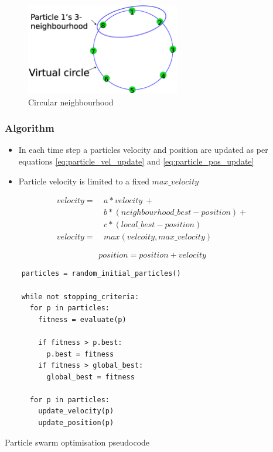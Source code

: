 \documentclass[a4paper]{article}
\begin{document}
\begin{figure}[h!]
  \centering
  \includegraphics[width=0.6\textwidth]{graphics/pso_neighbourhoods_3.eps}
  \caption{Circular neighbourhood}
  \label{fig:pso_neighbourhoods_3}
\end{figure}
\FloatBarrier

\subsubsection{Algorithm}

\begin{itemize}
  \item In each time step a particles velocity and position are updated as per
        equations \ref{eq:particle_vel_update} and \ref{eq:particle_pos_update}
  \item Particle velocity is limited to a fixed $max\_velocity$
\end{itemize}

\begin{equation}
  \label{eq:particle_vel_update}
  \begin{split}
    velocity = \: &a * velocity \: + \\
                  &b * (neighbourhood\_best - position) + \\
                  &c * (local\_best - position) \\
    velocity = \: &max(velcoity, max\_velocity)
  \end{split}
\end{equation}

\begin{equation}
  \label{eq:particle_pos_update}
  position = position + velocity
\end{equation}


\begin{listing}[h]
  \begin{verbatim}
    particles = random_initial_particles()

    while not stopping_criteria:
      for p in particles:
        fitness = evaluate(p)

        if fitness > p.best:
          p.best = fitness
        if fitness > global_best:
          global_best = fitness

      for p in particles:
        update_velocity(p)
        update_position(p)
  \end{verbatim}
  \caption{Particle swarm optimisation pseudocode}
  \label{listing:pso_pseudocode}
\end{listing}
\FloatBarrier
\end{document}
